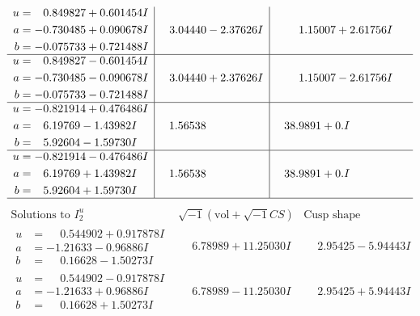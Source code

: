 \documentclass[1p]{elsarticle_modified}
\theoremstyle{definition}
\newcommand{\I}{\sqrt{-1}}
\begin{document}
$$\begin{array}{c|c|c}
\begin{aligned}
u &= \phantom{-}0.849827 + 0.601454 I \\
a &= -0.730485 + 0.090678 I \\
b &= -0.075733 + 0.721488 I\end{aligned}
 & \phantom{-}3.04440 - 2.37626 I & \phantom{-}1.15007 + 2.61756 I \\ \hline\begin{aligned}
u &= \phantom{-}0.849827 - 0.601454 I \\
a &= -0.730485 - 0.090678 I \\
b &= -0.075733 - 0.721488 I\end{aligned}
 & \phantom{-}3.04440 + 2.37626 I & \phantom{-}1.15007 - 2.61756 I \\ \hline\begin{aligned}
u &= -0.821914 + 0.476486 I \\
a &= \phantom{-}6.19769 - 1.43982 I \\
b &= \phantom{-}5.92604 - 1.59730 I\end{aligned}
 & \phantom{-}1.56538\phantom{ +0.000000I} & \phantom{-}38.9891 + 0. I\phantom{ +0.000000I} \\ \hline\begin{aligned}
u &= -0.821914 - 0.476486 I \\
a &= \phantom{-}6.19769 + 1.43982 I \\
b &= \phantom{-}5.92604 + 1.59730 I\end{aligned}
 & \phantom{-}1.56538\phantom{ +0.000000I} & \phantom{-}38.9891 + 0. I\phantom{ +0.000000I}\\
 \hline 
 \end{array}$$\newpage$$\begin{array}{c|c|c}  
\text{Solutions to }I^u_{2}& \I (\text{vol} + \sqrt{-1}CS) & \text{Cusp shape}\\
 \hline 
\begin{aligned}
u &= \phantom{-}0.544902 + 0.917878 I \\
a &= -1.21633 - 0.96886 I \\
b &= \phantom{-}0.16628 - 1.50273 I\end{aligned}
 & \phantom{-}6.78989 + 11.25030 I & \phantom{-}2.95425 - 5.94443 I \\ \hline\begin{aligned}
u &= \phantom{-}0.544902 - 0.917878 I \\
a &= -1.21633 + 0.96886 I \\
b &= \phantom{-}0.16628 + 1.50273 I\end{aligned}
 & \phantom{-}6.78989 - 11.25030 I & \phantom{-}2.95425 + 5.94443 I \\ \hline\begin{aligned}

\end{aligned}
\end{array}$$
\end{document}
